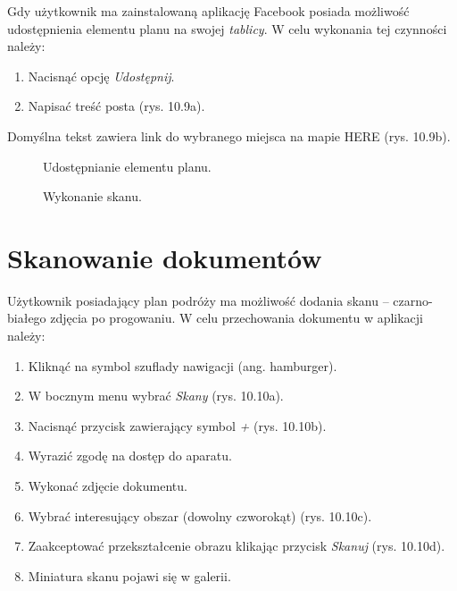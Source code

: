 \par Gdy użytkownik ma zainstalowaną aplikację Facebook posiada możliwość udostępnienia elementu planu na swojej \textit{tablicy}. W celu wykonania tej czynności należy:
\begin{enumerate}
\item Nacisnąć opcję \textit{Udostępnij}.
\item Napisać treść posta (rys. 10.9a).
\end{enumerate}
Domyślna tekst zawiera link do wybranego miejsca na mapie HERE (rys. 10.9b).

\begin{figure}[h]

\centering
\null\hfill
{}
\hfill
{}
\hfill\null

\caption{Udostępnianie elementu planu.}
\label{fig:podrecznik8a}
\end{figure}
\FloatBarrier

\begin{figure}[h]

\centering
\null\hfill
{}
\hfill
{}
\hfill\null

\null\hfill
{}
\hfill
{}
\hfill\null

\caption{Wykonanie skanu.}
\label{fig:podrecznik8}
\end{figure}
\FloatBarrier

\section{Skanowanie dokumentów}
Użytkownik posiadający plan podróży ma możliwość dodania skanu – czarno-białego zdjęcia po progowaniu.
W celu przechowania dokumentu w aplikacji należy:
\begin{enumerate}
\item Kliknąć na symbol szuflady nawigacji (ang. hamburger).
\item W bocznym menu wybrać \textit{Skany} (rys. 10.10a).
\item Nacisnąć przycisk zawierający symbol \textit{+} (rys. 10.10b).
\item Wyrazić zgodę na dostęp do aparatu.
\item Wykonać zdjęcie dokumentu.
\item Wybrać interesujący obszar (dowolny czworokąt) (rys. 10.10c).
\item Zaakceptować przekształcenie obrazu klikając przycisk \textit{Skanuj} (rys. 10.10d).
\item Miniatura skanu pojawi się w galerii.
\end{enumerate}

